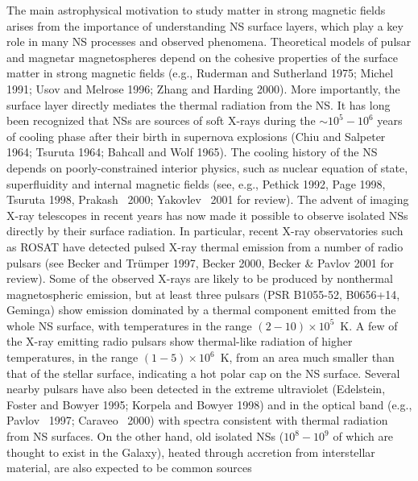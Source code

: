 The main astrophysical motivation to study matter in strong magnetic fields
arises from the importance of understanding NS surface layers,
which play a key role in many NS processes and observed phenomena.
Theoretical models of pulsar and magnetar magnetospheres depend on 
the cohesive properties of the surface matter in strong
magnetic fields (e.g., Ruderman and Sutherland 1975; Michel 1991;
Usov and Melrose 1996; 
Zhang and Harding 2000). More importantly, the surface layer directly mediates
the thermal radiation from the NS. It has long been recognized that NSs are
sources of soft X-rays during the $\sim 10^5-10^6$ years of cooling phase after
their birth in supernova explosions (Chiu and Salpeter 1964; Tsuruta 1964;
Bahcall and Wolf 1965). The cooling
history of the NS depends on poorly-constrained interior physics,
such as nuclear equation of state, superfluidity and internal magnetic 
fields (see, e.g., Pethick 1992, Page 1998, Tsuruta 1998, 
Prakash \etal~2000; Yakovlev \etal~2001 for review). 
The advent of imaging X-ray telescopes in recent years has now
made it possible to observe isolated NSs directly by their surface
radiation. In particular, recent X-ray observatories such as ROSAT 
have detected pulsed X-ray thermal emission from a number of radio pulsars 
(see Becker and Tr\"umper 1997, Becker 2000, Becker \&
Pavlov 2001 for review). 
Some of the observed X-rays are likely to be
produced by nonthermal magnetospheric emission, but at least three pulsars (PSR
B1055-52, B0656+14, Geminga) show emission dominated by a thermal component
emitted from the whole NS surface, with temperatures in the range
$(2-10)\times 10^5$~K. A few of the X-ray emitting radio pulsars show
thermal-like radiation of higher temperatures, in the range $(1-5)\times
10^6$~K, from an area much smaller than that of the stellar surface, 
indicating a hot polar cap on the NS surface. Several nearby pulsars have also
been detected in the extreme ultraviolet (Edelstein, Foster and Bowyer 1995; 
Korpela and Bowyer 1998)
and in the optical band (e.g., Pavlov \etal~1997; Caraveo \etal~2000)
with spectra consistent with thermal radiation from NS surfaces.
On the other hand, old isolated NSs ($10^8-10^9$ of 
which are thought to exist in the Galaxy), heated through accretion 
from interstellar material, are also expected to be common sources
